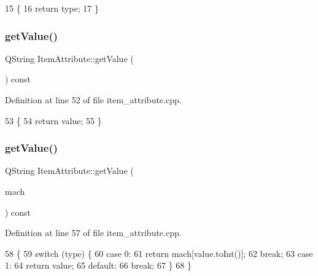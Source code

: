 \begin{DoxyCode}
15 \{
16     \textcolor{keywordflow}{return} type;
17 \}
\end{DoxyCode}
\mbox{\label{class_item_attribute_aa9c05254cd2706c7afc051c2f159278f}} 
\subsubsection{\texorpdfstring{get\+Value()}{getValue()}\hspace{0.1cm}{\footnotesize\ttfamily [1/2]}}
{\footnotesize\ttfamily Q\+String Item\+Attribute\+::get\+Value (\begin{DoxyParamCaption}{ }\end{DoxyParamCaption}) const}



Definition at line 52 of file item\+\_\+attribute.\+cpp.


\begin{DoxyCode}
53 \{
54     \textcolor{keywordflow}{return} value;
55 \}
\end{DoxyCode}
\mbox{\label{class_item_attribute_a8c00d3838c2406b6ebe6515246399896}} 
\subsubsection{\texorpdfstring{get\+Value()}{getValue()}\hspace{0.1cm}{\footnotesize\ttfamily [2/2]}}
{\footnotesize\ttfamily Q\+String Item\+Attribute\+::get\+Value (\begin{DoxyParamCaption}\item[{Q\+String\+List}]{mach }\end{DoxyParamCaption}) const}



Definition at line 57 of file item\+\_\+attribute.\+cpp.


\begin{DoxyCode}
58 \{
59     \textcolor{keywordflow}{switch} (type) \{
60     \textcolor{keywordflow}{case} 0:
61         \textcolor{keywordflow}{return} mach[value.toInt()];
62         \textcolor{keywordflow}{break};
63     \textcolor{keywordflow}{case} 1:
64         \textcolor{keywordflow}{return} value;
65     \textcolor{keywordflow}{default}:
66         \textcolor{keywordflow}{break};
67     \}
68 \}
\end{DoxyCode}
\mbox{\label{class_item_attribute_a5504e3f5abf4e2f48eba7893fc6d297e}} 
